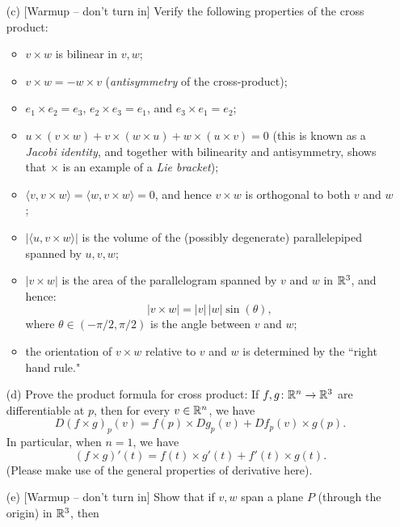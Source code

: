 \documentclass[a4paper, 12pt]{article}
\begin{document}
\begin{problem} 
\begin{enumerate}
\[\begin{pmatrix} {\bf i}
            \end{pmatrix},
        \]
        where the $v_i$'s and $w_i$'s are the components of $v$ and $w$, respectively, and ${\bf i}, {\bf j}, {\bf k}$ are symbolic placeholders for the coordinate vectors $e_1, e_2,e_3$.
        Compute the cross product of the vectors $(6,1,0), (0,2,2)$.
    \item[(c)] [Warmup -- don't turn in] Verify the following properties of the cross product:
        \begin{itemize}
            \item $v\times w$ is bilinear in $v,w$;
            \item $v\times w = -w\times v$ ({\em antisymmetry} of the cross-product);
            \item $e_1\times e_2 = e_3$, $e_2\times e_3 = e_1$, and $e_3\times e_1 = e_2$;
            \item $u\times (v\times w) + v\times(w\times u) +  w\times(u\times v) = 0$ (this is known as a {\em Jacobi identity}, and together with bilinearity and antisymmetry, shows that $\times$ is an example of a {\em Lie bracket});
            \item $\langle v,v\times w\rangle =  \langle w,v\times w\rangle =  0$, and hence $v\times w$ is orthogonal to both $v$ and $w$;
            \item $|\langle u, v\times w\rangle|$ is the volume of the (possibly degenerate) parallelepiped spanned by $u,v,w$;
            \item $|v\times w|$ is the area of the parallelogram spanned by $v$ and $w$ in $\mathbb{R}^3$, and hence:
                  \[|v\times w| = |v|\,|w|\sin(\theta),
                  \]
                  where $\theta\in (-\pi/2,\pi/2)$ is the angle between $v$ and $w$;
            \item the orientation of $v\times w$ relative to $v$ and $w$ is determined by the ``right hand rule."
        \end{itemize}
    \item[(d)] Prove the product formula for cross product: If $f,g\colon \mathbb{R}^n\to \mathbb{R}^3$ are differentiable at $p$, then for every $v\in\mathbb{R}^n$, we have
        \[D(f\times g)_p(v) = f(p)\times Dg_p(v) + Df_p(v)\times g(p).
        \]
        In particular, when $n=1$, we have
        \[(f\times g)'(t) = f(t)\times g'(t) + f'(t) \times g(t).
        \]
        (Please make use of the general properties of derivative here).
    \item[(e)] [Warmup -- don't turn in] Show that if $v,w$ span a plane $P$ (through the origin) in $\mathbb{R}^3$, then

\end{enumerate}
\end{problem}
\end{document}
